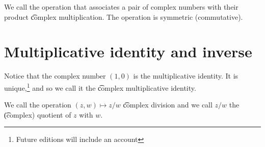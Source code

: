 We call the operation that associates a pair of complex numbers with their product \t{complex multiplication}.
The operation is symmetric (commutative).

\section*{Multiplicative identity and inverse}

Notice that the complex number $(1, 0)$ is the multiplicative identity.
It is unique,\footnote{Future editions will include an account}
and so we call it the \t{complex multiplicative identity.}

We call the operation $(z, w) \mapsto z/w$ \t{complex division} and we call $z/w$ the \t{(complex) quotient} of $z$ with $w$.
